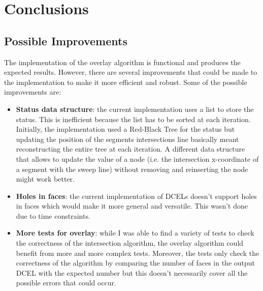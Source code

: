 \section{Conclusions}
\subsection{Possible Improvements}
The implementation of the overlay algorithm is functional and produces the expected results. However, there are several improvements that could be made to the implementation to make it more efficient and robust. Some of the possible improvements are:
\begin{itemize}
    \item \textbf{Status data structure}: the current implementation uses a list to store the status. This is inefficient because the list has to be sorted at each iteration. Initially, the implementation used a Red-Black Tree for the status but updating the position of the segments intersections line basically meant reconstructing the entire tree at each iteration. A different data structure that allows to update the value of a node (i.e. the intersection x-coordinate of a segment with the sweep line) without removing and reinserting the node might work better.
    \item \textbf{Holes in faces}: the current implementation of DCELs doesn't support holes in faces which would make it more general and versatile. This wasn't done due to time constraints.
    \item \textbf{More tests for overlay}: while I was able to find a variety of tests to check the correctness of the intersection algorithm, the overlay algorithm could benefit from more and more complex tests. Moreover, the tests only check the correctness of the algorithm by comparing the number of faces in the output DCEL with the expected number but this doesn't necessarily cover all the possible errors that could occur.
\end{itemize}
